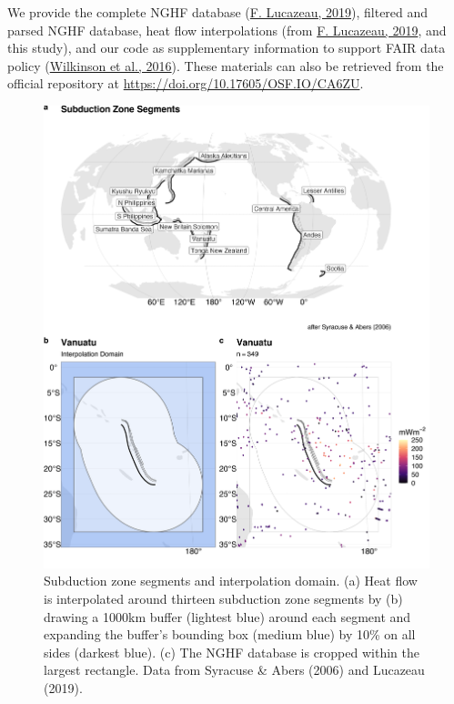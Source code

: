 \documentclass[draft,linenumbers]{agujournal2018}
\begin{document}
We provide the complete NGHF database
(\protect\hyperlink{ref-lucazeau2019}{F. Lucazeau, 2019}), filtered and
parsed NGHF database, heat flow interpolations (from
\protect\hyperlink{ref-lucazeau2019}{F. Lucazeau, 2019}, and this
study), and our code as supplementary information to support FAIR data
policy (\protect\hyperlink{ref-wilkinson2016}{Wilkinson et al., 2016}).
These materials can also be retrieved from the official repository at
\url{https://doi.org/10.17605/OSF.IO/CA6ZU}.

\begin{figure}[h]

{\centering \includegraphics[width=0.95\linewidth,]{../figs/base/segs_comp} 

}

\caption{Subduction zone segments and interpolation domain. (a) Heat flow is interpolated around thirteen subduction zone segments by (b) drawing a 1000km buffer (lightest blue) around each segment and expanding the buffer's bounding box (medium blue) by 10\% on all sides (darkest blue). (c) The NGHF database is cropped within the largest rectangle. Data from Syracuse \& Abers (2006) and Lucazeau (2019).}\label{fig:segments}
\end{figure}
\end{document}
